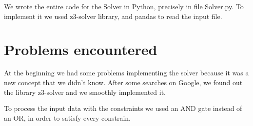 \documentclass[12pt]{article}
\begin{document}
We wrote the entire code for the Solver in Python, precisely in file Solver.py. To implement it we used z3-solver library, and pandas to read the input file. 
\newpage
\section{Problems encountered}
At the beginning we had some problems implementing the solver because it was a new concept that we didn't know. After some searches on Google, we found out the library z3-solver and we smoothly implemented it. 

To process the input data with the constraints we used an AND gate instead of an OR, in order to satisfy every constrain.
\end{document}
